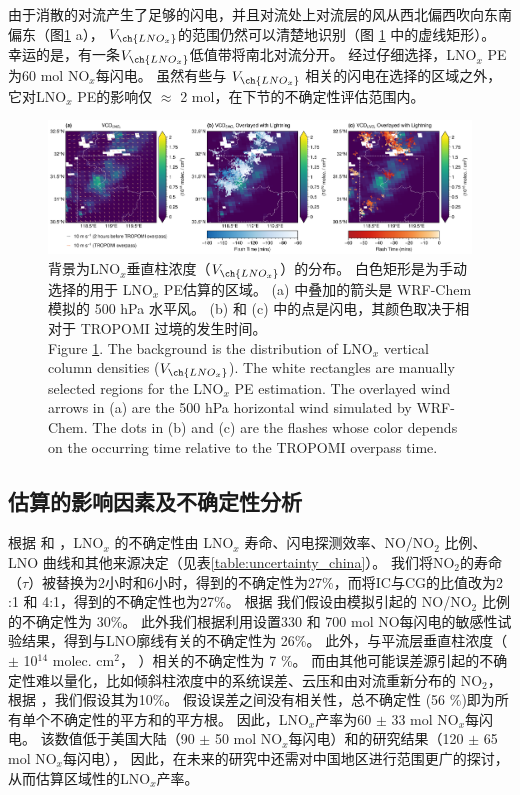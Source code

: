 由于消散的对流产生了足够的闪电，并且对流处上对流层的风从西北偏西吹向东南偏东（图\ref{fig:china_vcd_lnox} a），
$V_{\ch{LNO_x}}$的范围仍然可以清楚地识别（图 \ref{fig:china_vcd_lnox} 中的虚线矩形）。
幸运的是，有一条$V_{\ch{LNO_x}}$低值带将南北对流分开。
经过仔细选择，LNO$_x$ PE 为60 mol NO$_x$每闪电。
虽然有些与 $V_{\ch{LNO_x}}$ 相关的闪电在选择的区域之外，它对LNO$_x$ PE的影响仅 $\approx$ 2 mol，在下节的不确定性评估范围内。


\begin{figure}[!htbp]
    \centering
    \includegraphics[width=16cm]{./figures/china_vcd_lnox.png}
    \caption{
    背景为LNO$_x$垂直柱浓度（$V_{\ch{LNO_x}}$）的分布。
     白色矩形是为手动选择的用于 LNO$_x$ PE估算的区域。
     (a) 中叠加的箭头是 WRF-Chem 模拟的 500 hPa 水平风。
     (b) 和 (c) 中的点是闪电，其颜色取决于相对于 TROPOMI 过境的发生时间。\\
    Figure \ref{fig:china_vcd_lnox}. The background is the distribution of LNO$_x$ vertical column densities ($V_{\ch{LNO_x}}$).
    The white rectangles are manually selected regions for the LNO$_x$ PE estimation.
    The overlayed wind arrows in (a) are the 500 hPa horizontal wind simulated by WRF-Chem.
    The dots in (b) and (c) are the flashes whose color depends on the occurring time relative to the TROPOMI overpass time.
    }
    \label{fig:china_vcd_lnox}
\end{figure}



\subsection{估算的影响因素及不确定性分析} \label{sec:uncertainty_china}

根据 \citet{Allen.2019} 和 \citet{Zhang.2020b}，LNO$_x$ 的不确定性由 LNO$_x$ 寿命、闪电探测效率、NO/NO$_2$ 比例、LNO 曲线和其他来源决定（见表\ref{table:uncertainty_china}）。
我们将NO$_2$的寿命（$\tau$）被替换为2小时和6小时，得到的不确定性为27\%，而将IC与CG的比值改为2 :1 和 4:1，得到的不确定性也为27\%。
根据 \citet{Allen.2019} 我们假设由模拟引起的 NO/NO$_2$ 比例的不确定性为 30\%。
此外我们根据利用设置330 和 700 mol NO每闪电的敏感性试验结果，得到与LNO廓线有关的不确定性为 26\%。
此外，与平流层垂直柱浓度（$\pm$ 10$^{14}$ molec. cm$^2$， \citet{VanGeffen.2022}）相关的不确定性为 7 \%。
而由其他可能误差源引起的不确定性难以量化，比如倾斜柱浓度中的系统误差、云压和由对流重新分布的 NO$_2$，根据 \citet{Allen.2021a}，我们假设其为10\%。
假设误差之间没有相关性，总不确定性 (56 \%)即为所有单个不确定性的平方和的平方根。
因此，LNO$_x$产率为60 $\pm$ 33 mol NO$_x$每闪电。
该数值低于美国大陆（90 $\pm$ 50 mol NO$_x$每闪电）和\citet{Allen.2021a}的研究结果（120 $\pm$ 65 mol NO$_x$每闪电），
因此，在未来的研究中还需对中国地区进行范围更广的探讨，从而估算区域性的LNO$_x$产率。


